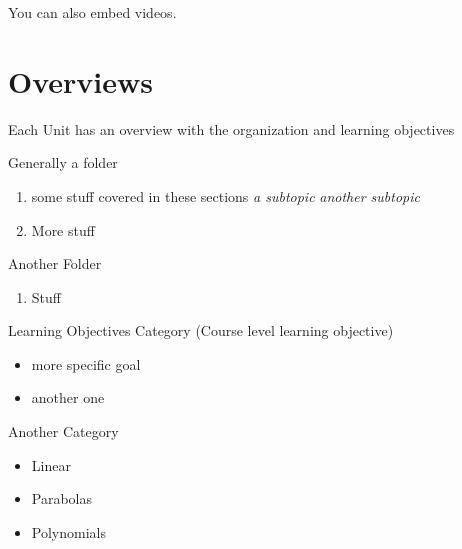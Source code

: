 \documentclass[nooutcomes]{ximera}
\begin{document}
You can also embed  videos.
\begin{center}
\end{center}





\newpage


\section{Overviews}

Each Unit has an overview with the organization and learning objectives

\begin{overview}
\item Generally a folder %
	\begin{enumerate}
	\item some stuff covered in these sections
		\textit{a subtopic} 
		\textit{another subtopic} 
	\item More stuff	
	\end{enumerate}	
\item Another Folder 
	\begin{enumerate}	
	\item Stuff 
	\end{enumerate} 
\end{overview}


\begin{objectives}
\item Learning Objectives Category (Course level learning objective)
	\begin{itemize}
	\item more specific goal
	\item another one 
	\end{itemize}
\item Another Category
	\begin{itemize}
	\item Linear 
	\item Parabolas 
	\item Polynomials 
	\end{itemize}
\end{objectives}




\newpage
\end{document}
